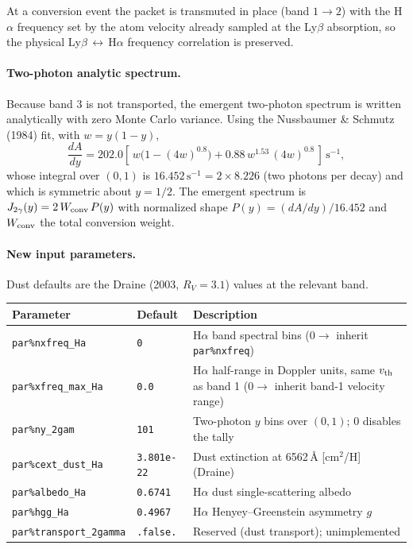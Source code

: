 \documentclass[english,a4paper]{my_memo}
\newcommand{\parm}[1]{\texttt{par\%#1}}
\begin{document}
At a conversion event the packet is transmuted in place (band $1\!\rightarrow\!2$)
with the H$\alpha$ frequency set by the atom velocity already sampled at the
Ly$\beta$ absorption, so the physical Ly$\beta$\,$\leftrightarrow$\,H$\alpha$
frequency correlation is preserved.

\paragraph{Two-photon analytic spectrum.}
Because band 3 is not transported, the emergent two-photon spectrum
is written analytically with zero Monte Carlo variance. Using the
Nussbaumer \& Schmutz (1984) fit, with $w = y(1-y)$,
\begin{equation}
  \frac{dA}{dy} = 202.0\left[\, w\bigl(1 - (4w)^{0.8}\bigr)
                 + 0.88\, w^{1.53}\,(4w)^{0.8} \,\right]\,\mathrm{s^{-1}},
\end{equation}
whose integral over $(0,1)$ is $16.452\,\mathrm{s^{-1}} = 2\times 8.226$
(two photons per decay) and which is symmetric about $y = 1/2$. The emergent
spectrum is $J_{2\gamma}(y) = 2\,W_{\rm conv}\,P(y)$ with normalized shape
$P(y) = (dA/dy)/16.452$ and $W_{\rm conv}$ the total conversion weight.

\paragraph{New input parameters.}
Dust defaults are the Draine (2003, $R_V = 3.1$) values at the relevant band.

\begin{center}
\begin{tabular}{@{}l l L{7.2cm}@{}}
\toprule
Parameter & Default & Description \\
\midrule
\parm{nxfreq\_Ha}     & \texttt{0} & H$\alpha$ band spectral bins ($0\rightarrow$ inherit \parm{nxfreq}) \\
\parm{xfreq\_max\_Ha} & \texttt{0.0} & H$\alpha$ half-range in Doppler units, same $v_{\rm th}$ as band 1 ($0\rightarrow$ inherit band-1 velocity range) \\
\parm{ny\_2gam}       & \texttt{101} & Two-photon $y$ bins over $(0,1)$; $0$ disables the tally \\
\parm{cext\_dust\_Ha} & \texttt{3.801e-22} & Dust extinction at 6562\,\AA{} [cm$^2$/H] (Draine) \\
\parm{albedo\_Ha}     & \texttt{0.6741} & H$\alpha$ dust single-scattering albedo \\
\parm{hgg\_Ha}        & \texttt{0.4967} & H$\alpha$ Henyey--Greenstein asymmetry $g$ \\
\parm{transport\_2gamma} & \texttt{.false.} & Reserved (dust transport); unimplemented \\
\bottomrule
\end{tabular}
\end{center}
\end{document}
